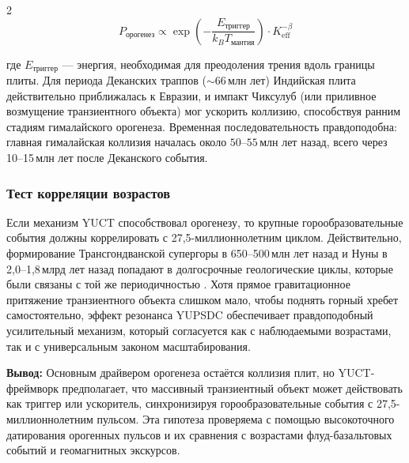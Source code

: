\documentclass[11pt,a4paper]{article}
\begin{document}
\begin{multicols}{2}
		\begin{equation}
			P_{\text{орогенез}} \propto \exp\left(-\frac{E_{\text{триггер}}}{k_B T_{\text{мантия}}}\right) \cdot K_{\mathrm{eff}}^{-\beta}
		\end{equation}
		
		где \(E_{\text{триггер}}\) — энергия, необходимая для преодоления трения вдоль границы плиты. Для периода Деканских траппов (\(\sim 66\) млн лет) Индийская плита действительно приближалась к Евразии, и импакт Чиксулуб (или приливное возмущение транзиентного объекта) мог ускорить коллизию, способствуя ранним стадиям гималайского орогенеза. Временная последовательность правдоподобна: главная гималайская коллизия началась около \(50\)–\(55\) млн лет назад, всего через 10–15 млн лет после Деканского события.
		
		\subsubsection{Тест корреляции возрастов}
		
		Если механизм YUCT способствовал орогенезу, то крупные горообразовательные события должны коррелировать с 27,5-миллионнолетним циклом. Действительно, формирование Трансгондванской супергоры в 650–500 млн лет назад и Нуны в 2,0–1,8 млрд лет назад \cite{CampbellAllen2008} попадают в долгосрочные геологические циклы, которые были связаны с той же периодичностью \cite{Rampino2021}. Хотя прямое гравитационное притяжение транзиентного объекта слишком мало, чтобы поднять горный хребет самостоятельно, эффект резонанса YUPSDC обеспечивает правдоподобный усилительный механизм, который согласуется как с наблюдаемыми возрастами, так и с универсальным законом масштабирования.
		
		\vspace{0.3cm}
		\noindent
		\textbf{Вывод:} Основным драйвером орогенеза остаётся коллизия плит, но YUCT-фреймворк предполагает, что массивный транзиентный объект может действовать как триггер или ускоритель, синхронизируя горообразовательные события с 27,5-миллионнолетним пульсом. Эта гипотеза проверяема с помощью высокоточного датирования орогенных пульсов и их сравнения с возрастами флуд-базальтовых событий и геомагнитных экскурсов.
		
	\end{multicols}
	
\end{document}
